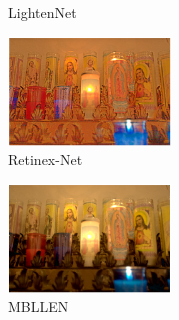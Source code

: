 \documentclass[letterpaper,12pt]{article}
\begin{document}
\begin{figure}[htbp]
\begin{subfigure}{0.18\textwidth}
			\captionsetup{font=scriptsize}
			\caption{LightenNet}
			\label{fig: MIT-Adobe_FiveK_c}  
		\end{subfigure}
		\begin{subfigure}{0.18\textwidth}
			\includegraphics[width=\linewidth]{MIT-Adobe_FiveK/Retinex-Net}
			\captionsetup{font=scriptsize}
			\caption{Retinex-Net}
			\label{fig: MIT-Adobe_FiveK_d}
		\end{subfigure}
		\begin{subfigure}{0.18\textwidth}
			\includegraphics[width=\linewidth]{MIT-Adobe_FiveK/MBLLEN}
			\captionsetup{font=scriptsize}
			\caption{MBLLEN}
			\label{fig: MIT-Adobe_FiveK_e}
		\end{subfigure}\\
		\begin{subfigure}{0.18\textwidth}

\end{subfigure}
\end{figure}
\end{document}
